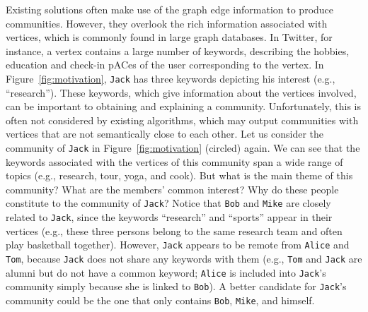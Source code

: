 Existing solutions often make use of the graph edge information to produce communities. However, they overlook the rich information associated with vertices, which is commonly found in large graph databases. In Twitter, for instance, a vertex contains a large number of keywords, describing the hobbies, education and check-in pACes of the user corresponding to the vertex. In Figure~\ref{fig:motivation}, {\tt Jack} has three keywords depicting his interest (e.g., ``research''). These keywords, which give information about the vertices involved, can be important to obtaining and explaining a community. Unfortunately, this is often not considered by existing algorithms, which may output communities with vertices that are not semantically close to each other. Let us consider the community of {\tt Jack} in Figure~\ref{fig:motivation} (circled) again.  We can see that the keywords associated with the vertices of this community span a wide range of topics (e.g., research, tour, yoga, and cook). But what is the main theme of this community? What are the members' common interest? Why do these people constitute to the community of {\tt Jack}? Notice that {\tt Bob} and {\tt Mike} are closely related to {\tt Jack}, since the keywords ``research'' and ``sports'' appear in their vertices (e.g., these three persons belong to the same research team and often play basketball together).  However, {\tt Jack} appears to be remote from {\tt Alice} and {\tt Tom}, because {\tt Jack} does not share any keywords with them (e.g., {\tt Tom} and {\tt Jack} are alumni but do not have a common keyword; {\tt Alice} is included into {\tt Jack}'s community simply because she is linked to {\tt Bob}). A better candidate for {\tt Jack}'s community could be the one that only contains {\tt Bob}, {\tt Mike}, and himself.

